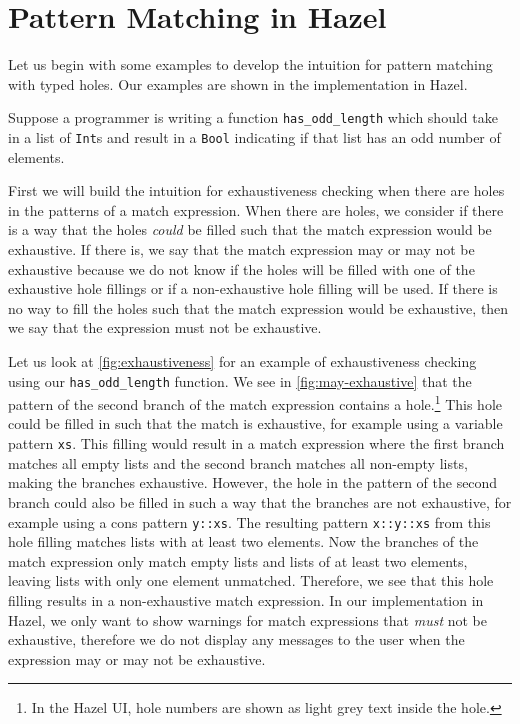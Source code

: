 \section{Pattern Matching in Hazel}\label{sec:examples}
Let us begin with some examples to develop the intuition for pattern matching with typed holes.
Our examples are shown in the implementation in Hazel.

Suppose a programmer is writing a function \texttt{has\_odd\_length} which should take in a list of \texttt{Int}s and result in a \texttt{Bool} indicating if that list has an odd number of elements. 

First we will build the intuition for exhaustiveness checking when there are holes in the patterns of a match expression. 
When there are holes, we consider if there is a way that the holes \emph{could} be filled such that the match expression would be exhaustive. 
If there is, we say that the match expression may or may not be exhaustive because we do not know if the holes will be filled with one of the exhaustive hole fillings or if a non-exhaustive hole filling will be used. 
If there is no way to fill the holes such that the match expression would be exhaustive, then we say that the expression must not be exhaustive. 

Let us look at \autoref{fig:exhaustiveness} for an example of exhaustiveness checking using our \texttt{has\_odd\_length} function. 
We see in \autoref{fig:may-exhaustive} that the pattern of the second branch of the match expression contains a hole.\footnote{In the Hazel UI, hole numbers are shown as light grey text inside the hole. } 
This hole could be filled in such that the match is exhaustive, for example using a variable pattern \texttt{xs}. 
This filling would result in a match expression where the first branch matches all empty lists and the second branch matches all non-empty lists, making the branches exhaustive. 
However, the hole in the pattern of the second branch could also be filled in such a way that the branches are not exhaustive, for example using a cons pattern \texttt{y::xs}. 
The resulting pattern \texttt{x::y::xs} from this hole filling matches lists with at least two elements.
Now the branches of the match expression only match empty lists and lists of at least two elements, leaving lists with only one element unmatched. 
Therefore, we see that this hole filling results in a non-exhaustive match expression. 
In our implementation in Hazel, we only want to show warnings for match expressions that \emph{must} not be exhaustive, therefore we do not display any messages to the user when the expression may or may not be exhaustive. 


